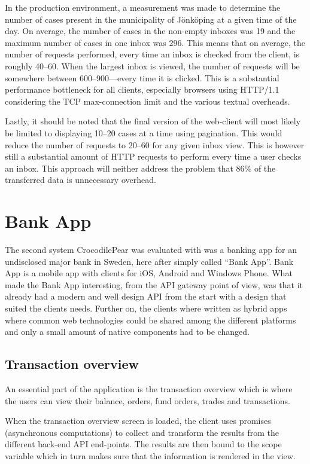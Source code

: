 \documentclass{cslthse-msc}
\begin{document}
In the production environment, a measurement was made to determine the number of cases present in the municipality of Jönköping at a given time of the day. On average, the number of cases in the non-empty inboxes was 19 and the maximum number of cases in one inbox was 296. This means that on average, the number of requests performed, every time an inbox is checked from the client, is roughly 40--60. When the largest inbox is viewed, the number of requests will be somewhere between 600--900---every time it is clicked. This is a substantial performance bottleneck for all clients, especially browsers using HTTP/1.1 considering the TCP max-connection limit and the various textual overheads.

Lastly, it should be noted that the final version of the web-client will most likely be limited to displaying 10--20 cases at a time using pagination. This would reduce the number of requests to 20--60 for any given inbox view. This is however still a substantial amount of HTTP requests to perform every time a user checks an inbox. This approach will neither address the problem that 86\% of the transferred data is unnecessary overhead.

\section{Bank App}
The second system CrocodilePear was evaluated with was a banking app for an undisclosed major bank in Sweden, here after simply called \enquote{Bank App}. Bank App is a mobile app with clients for iOS, Android and Windows Phone. What made the Bank App interesting, from the API gateway point of view, was that it already had a modern and well design API from the start with a design that suited the clients needs. Further on, the clients where written as hybrid apps where common web technologies could be shared among the different platforms and only a small amount of native components had to be changed.

\subsection{Transaction overview}
An essential part of the application is the transaction overview which is where the users can view their balance, orders, fund orders, trades and transactions.

When the transaction overview screen is loaded, the client uses promises (asynchronous computations) to collect and transform the results from the different back-end API end-points. The results are then bound to the scope variable which in turn makes sure that the information is rendered in the view.
\end{document}
